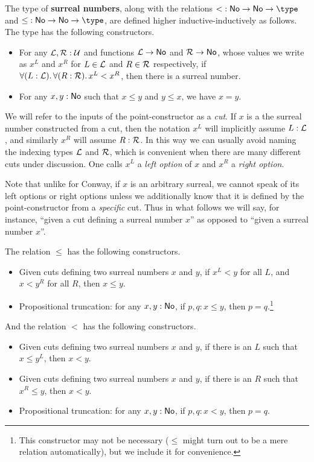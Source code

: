 \begin{defn}
  The type \NO of \textbf{surreal numbers}, along with the relations $\mathord<:\NO\to\NO\to\type$ and $\mathord\le:\NO\to\NO\to\type$, are defined higher inductive-inductively as follows.
  The type \NO has the following constructors.
  \begin{itemize}
  \item For any $\mathcal{L},\mathcal{R}:\mathcal{U}$ and functions $\mathcal{L}\to \mathsf{No}$ and $\mathcal{R}\to \mathsf{No}$, whose values we write as $x^L$ and $x^R$ for $L\in\mathcal{L}$ and $R\in\mathcal{R}$ respectively, if $\fall{L:\LL}{R:\RR} x^L<x^R$, then there is a surreal number.
  \item For any $x,y:\mathsf{No}$ such that $x\le y$ and $y\le x$, we have $x=y$.
  \end{itemize}
  We will refer to the inputs of the point-constructor as a \emph{cut}.
  If $x$ is a the surreal number constructed from a cut, then the notation $x^L$ will implicitly assume $L:\mathcal{L}$, and similarly $x^R$ will assume $R:\mathcal{R}$.
  In this way we can usually avoid naming the indexing types $\mathcal{L}$ and $\mathcal{R}$, which is convenient when there are many different cuts under discussion.
  One calls $x^L$ a \emph{left option} of $x$ and $x^R$ a \emph{right option}.

  Note that unlike for Conway, if $x$ is an arbitrary surreal, we cannot speak of its left options or right options unless we additionally know that it is defined by the point-constructor from a \emph{specific} cut.
  Thus in what follows we will say, for instance, ``given a cut defining a surreal number $x$'' as opposed to ``given a surreal number $x$''.

  The relation $\le$ has the following constructors.
  \begin{itemize}
  \item Given cuts defining two surreal numbers $x$ and $y$, if $x^L<y$ for all $L$, and $x<y^R$ for all $R$, then $x\le y$.
  \item Propositional truncation: for any $x,y:\mathsf{No}$, if $p,q:x\le y$, then $p=q$.\footnote{This constructor may not be necessary ($\le$ might turn out to be a mere relation automatically), but we include it for convenience.}
  \end{itemize}
  And the relation $<$ has the following constructors.
  \begin{itemize}
  \item Given cuts defining two surreal numbers $x$ and $y$, if there is an $L$ such that $x\le y^L$, then $x<y$.
  \item Given cuts defining two surreal numbers $x$ and $y$, if there is an $R$ such that $x^R\le y$, then $x<y$.
  \item Propositional truncation: for any $x,y:\mathsf{No}$, if $p,q:x<y$, then $p=q$.
  \end{itemize}
\end{defn}

